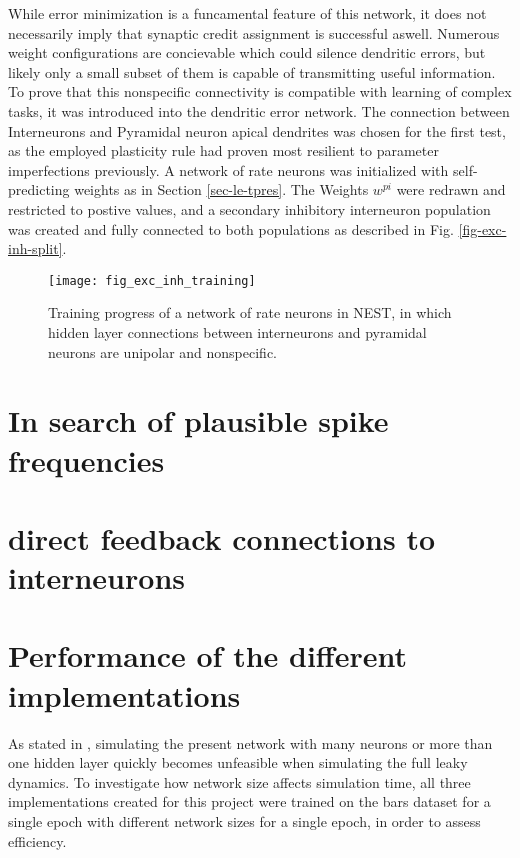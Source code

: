 While error minimization is a funcamental feature of this network, it does not necessarily imply that synaptic credit
assignment is successful aswell. Numerous weight configurations are concievable which could silence dendritic errors,
but likely only a small subset of them is capable of transmitting useful information. To prove that this nonspecific
connectivity is compatible with learning of complex tasks, it was introduced into the dendritic error network. The
connection between Interneurons and Pyramidal neuron apical dendrites was chosen for the first test, as the employed
plasticity rule had proven most resilient to parameter imperfections previously. A network of rate neurons was
initialized with self-predicting weights as in Section \ref{sec-le-tpres}. The Weights $w^{pi}$ were redrawn and
restricted to postive values, and a secondary inhibitory interneuron population was created and fully connected to both
populations as described in Fig. \ref{fig-exc-inh-split}.


\begin{figure}[t]
    \centering
    \texttt{[image: fig\_exc\_inh\_training]}
    \caption{Training progress of a network of rate neurons in NEST, in which hidden layer connections between
        interneurons and pyramidal neurons are unipolar and nonspecific.}
    \label{fig-exc-inh-training}
\end{figure}


\section{In search of plausible spike frequencies}



\section{direct feedback connections to interneurons}\label{sec-electric-syns}

\cite{Vaughn2022,Mancilla2007}



\section{Performance of the different implementations}\label{sec-benchmark}

As stated in \cite{Haider2021}, simulating the present network with many neurons or more than one hidden layer quickly
becomes unfeasible when simulating the full leaky dynamics. To investigate how network size affects simulation time, all
three implementations created for this project were trained on the bars dataset for a single epoch with different
network sizes for a single epoch, in order to assess efficiency.



